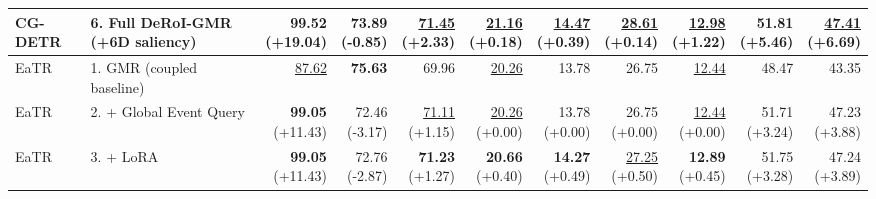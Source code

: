 \documentclass{article}
\begin{document}
{\begin{tabular}{llrrrrrrrrr}
CG-DETR & 6. Full DeRoI-GMR (+6D saliency) & \shortstack{\textbf{99.52} \\ {\scriptsize (+19.04)}} & \shortstack{73.89 \\ {\scriptsize (-0.85)}} & \shortstack{\underline{71.45} \\ {\scriptsize (+2.33)}} & \shortstack{\underline{21.16} \\ {\scriptsize (+0.18)}} & \shortstack{\underline{14.47} \\ {\scriptsize (+0.39)}} & \shortstack{\underline{28.61} \\ {\scriptsize (+0.14)}} & \shortstack{\underline{12.98} \\ {\scriptsize (+1.22)}} & \shortstack{51.81 \\ {\scriptsize (+5.46)}} & \shortstack{\underline{47.41} \\ {\scriptsize (+6.69)}} \\
\midrule
EaTR & 1. GMR (coupled baseline) & \underline{87.62} & \textbf{75.63} & 69.96 & \underline{20.26} & 13.78 & 26.75 & \underline{12.44} & 48.47 & 43.35 \\
EaTR & 2. + Global Event Query & \shortstack{\textbf{99.05} \\ {\scriptsize (+11.43)}} & \shortstack{72.46 \\ {\scriptsize (-3.17)}} & \shortstack{\underline{71.11} \\ {\scriptsize (+1.15)}} & \shortstack{\underline{20.26} \\ {\scriptsize (+0.00)}} & \shortstack{13.78 \\ {\scriptsize (+0.00)}} & \shortstack{26.75 \\ {\scriptsize (+0.00)}} & \shortstack{\underline{12.44} \\ {\scriptsize (+0.00)}} & \shortstack{51.71 \\ {\scriptsize (+3.24)}} & \shortstack{47.23 \\ {\scriptsize (+3.88)}} \\
EaTR & 3. + LoRA & \shortstack{\textbf{99.05} \\ {\scriptsize (+11.43)}} & \shortstack{72.76 \\ {\scriptsize (-2.87)}} & \shortstack{\textbf{71.23} \\ {\scriptsize (+1.27)}} & \shortstack{\textbf{20.66} \\ {\scriptsize (+0.40)}} & \shortstack{\textbf{14.27} \\ {\scriptsize (+0.49)}} & \shortstack{\underline{27.25} \\ {\scriptsize (+0.50)}} & \shortstack{\textbf{12.89} \\ {\scriptsize (+0.45)}} & \shortstack{51.75 \\ {\scriptsize (+3.28)}} & \shortstack{47.24 \\ {\scriptsize (+3.89)}} \\

\end{tabular}}
\end{document}
